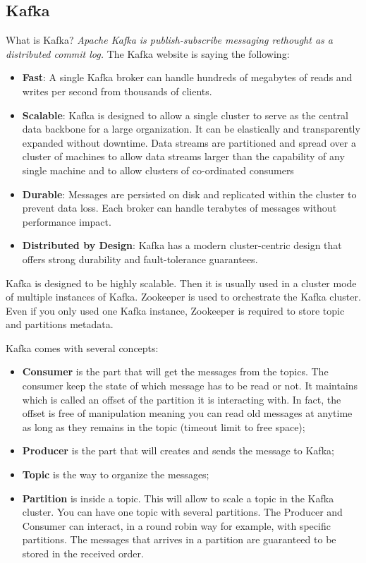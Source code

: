 \subsection{Kafka}

What is Kafka? \emph{Apache Kafka is publish-subscribe messaging rethought as a distributed commit log.} The Kafka website is saying the following:

\begin{itemize}
\item\textbf{Fast}: A single Kafka broker can handle hundreds of megabytes of reads and writes per second from thousands of clients.
\item\textbf{Scalable}: Kafka is designed to allow a single cluster to serve as the central data backbone for a large organization. It can be elastically and transparently expanded without downtime. Data streams are partitioned and spread over a cluster of machines to allow data streams larger than the capability of any single machine and to allow clusters of co-ordinated consumers
\item\textbf{Durable}: Messages are persisted on disk and replicated within the cluster to prevent data loss. Each broker can handle terabytes of messages without performance impact.
\item\textbf{Distributed by Design}: Kafka has a modern cluster-centric design that offers strong durability and fault-tolerance guarantees. 
\end{itemize}

Kafka is designed to be highly scalable. Then it is usually used in a cluster mode of multiple instances of Kafka. Zookeeper is used to orchestrate the Kafka cluster. Even if you only used one Kafka instance, Zookeeper is required to store topic and partitions metadata.

Kafka comes with several concepts:

\begin{itemize}
\item\textbf{Consumer} is the part that will get the messages from the topics. The consumer keep the state of which message has to be read or not. It maintains which is called an offset of the partition it is interacting with. In fact, the offset is free of manipulation meaning you can read old messages at anytime as long as they remains in the topic (timeout limit to free space);
\item\textbf{Producer} is the part that will creates and sends the message to Kafka;
\item\textbf{Topic} is the way to organize the messages;
\item\textbf{Partition} is inside a topic. This will allow to scale a topic in the Kafka cluster. You can have one topic with several partitions. The Producer and Consumer can interact, in a round robin way for example, with specific partitions. The messages that arrives in a partition are guaranteed to be stored in the received order.
\end{itemize}

